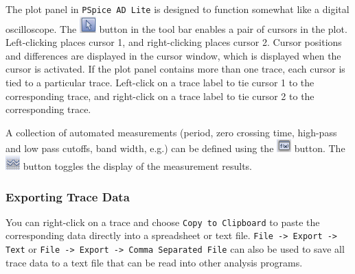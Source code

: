\documentclass[11pt]{article}
\begin{document}
The plot panel in \texttt{PSpice AD Lite} is designed to function
somewhat like a digital oscilloscope. The
\includegraphics{PSpiceAD_Cursor.png} button in the  tool bar enables
a pair of cursors in the plot. Left-clicking places cursor 1, and
right-clicking places cursor 2. Cursor positions and differences are
displayed in the cursor window, which is displayed when the cursor is
activated. If the plot panel contains more than one trace, each cursor
is tied to a particular trace. Left-click on a trace label to tie
cursor 1 to the corresponding trace, and right-click on a trace label
to tie cursor 2 to the corresponding trace.

A collection of automated measurements (period, zero crossing time,
high-pass and low pass cutoffs, band width, e.g.) can be defined using
the \includegraphics{PSpiceAD_DefineMeasurement.png} button. The 
\includegraphics{PSpiceAD_ToggleMeasurement.png} button toggles the
display of the measurement results.

\subsubsection*{Exporting Trace Data}

You can right-click on a trace and choose \texttt{Copy to Clipboard}
to paste the corresponding data directly into a spreadsheet or text
file. \texttt{File -> Export -> Text} or
\texttt{File -> Export -> Comma Separated File} can also be used to
save all trace data to a text file that can be read into other
analysis programs.
\end{document}
